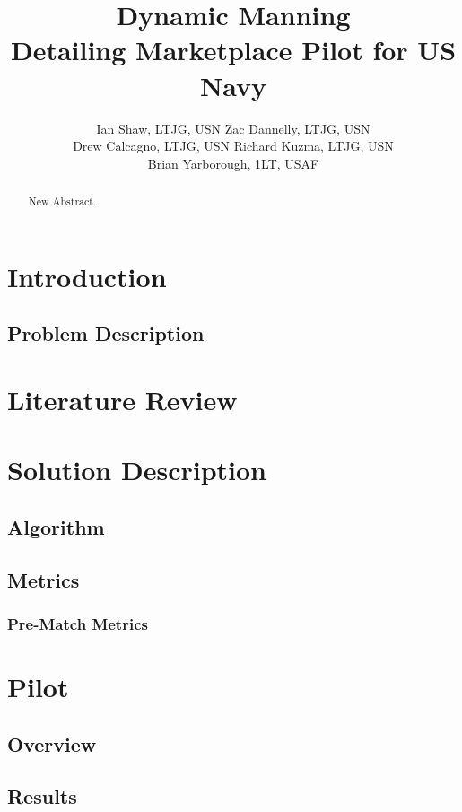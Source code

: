 \documentclass{article}
\title{Dynamic Manning \\ \large Detailing Marketplace Pilot for US Navy}
\author{Ian Shaw, LTJG, USN \quad Zac Dannelly, LTJG, USN \\
Drew Calcagno, LTJG, USN \quad Richard Kuzma, LTJG, USN \\ Brian Yarborough, 1LT, USAF}
\begin{document}
\maketitle

\begin{abstract}
New Abstract.
\end{abstract}


\newpage

\tableofcontents

\newpage

\section{Introduction}

\subsection{Problem Description}

\section{Literature Review}

\section{Solution Description}

\subsection{Algorithm}

\subsection{Metrics}

\subsubsection{Pre-Match Metrics}

\section{Pilot}

\subsection{Overview}

\subsection{Results}
\end{document}

